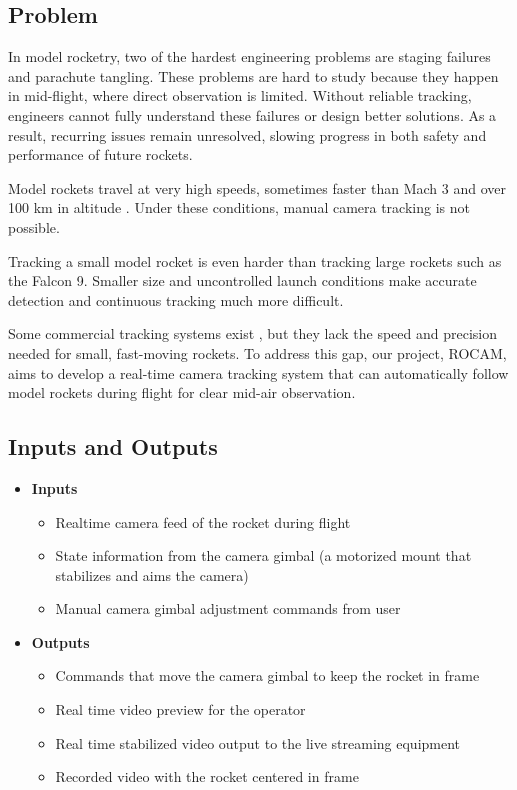 \documentclass{article}
\begin{document}

\subsection{Problem}

In model rocketry, two of the hardest engineering problems are staging failures
and parachute tangling. These problems are hard to study because they happen in
mid-flight, where direct observation is limited. Without reliable tracking,
engineers cannot fully understand these failures or design better solutions. As
a result, recurring issues remain unresolved, slowing progress in both safety
and performance of future rockets.

Model rockets travel at very high speeds, sometimes faster than Mach 3 and over
100 km in altitude \citep{SpaceConcordiaRocketry2025}. Under these conditions,
manual camera tracking is not possible.

Tracking a small model rocket is even harder than tracking large rockets such as
the Falcon 9. Smaller size and uncontrolled launch conditions make accurate
detection and continuous tracking much more difficult.

Some commercial tracking systems exist \citep{AverTR3XX2021}, but they lack the
speed and precision needed for small, fast-moving rockets. To address this gap,
our project, ROCAM, aims to develop a real-time camera tracking system that can
automatically follow model rockets during flight for clear mid-air observation.


\subsection{Inputs and Outputs}
\begin{itemize}
  \item \textbf{Inputs}
        \begin{itemize}
          \item Realtime camera feed of the rocket during flight
          \item State information from the camera gimbal (a motorized mount that stabilizes and aims the camera)
          \item Manual camera gimbal adjustment commands from user
        \end{itemize}

  \item \textbf{Outputs}
        \begin{itemize}
          \item Commands that move the camera gimbal to keep the rocket in frame
          \item Real time video preview for the operator
          \item Real time stabilized video output to the live streaming equipment
          \item Recorded video with the rocket centered in frame
        \end{itemize}
\end{itemize}
\end{document}
